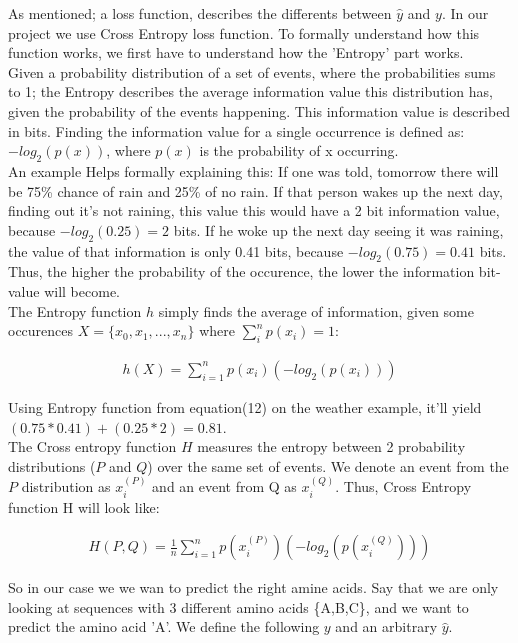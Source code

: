 As mentioned; a loss function, describes the differents between $\hat{y}$ and $y$. In our project we use Cross Entropy loss function. To formally understand how this function works, we first have to understand how the 'Entropy' part works. \\

\noindent
Given a probability distribution of a set of events, where the probabilities sums to 1; the Entropy describes the average information value this distribution has, given the probability of the events happening. This information value is described in bits. Finding the information value for a single occurrence is defined as: $-log_2(p(x))$, where $p(x)$ is the probability of x occurring.\\

\noindent
An example Helps formally explaining this: If one was told, tomorrow there will be 75\% chance of rain and 25\% of no rain. If that person wakes up the next day, finding out it's not raining, this value this would have a 2 bit information value, because $-log_2(0.25) = 2$ bits. If he woke up the next day seeing it was raining, the value of that information is only 0.41 bits, because $-log_2(0.75) = 0.41$ bits. Thus, the higher the probability of the occurence, the lower the information bit-value will become. \\

\noindent
The Entropy function $h$ simply finds the average of information, given some occurences $X=\{x_0,x_1,...,x_n\}$ where $\sum^n_{i} p(x_i) = 1$:

\begin{align}
	h(X) = \sum^n_{i=1} p(x_i)(-log_2(p(x_i)))
\end{align}

\noindent
Using Entropy function from equation(12) on the weather example, it'll yield $(0.75 * 0.41) + (0.25 * 2) = 0.81$.\\

\noindent
The Cross entropy function $H$ measures the entropy between 2 probability distributions ($P$ and $Q$) over the same set of events. We denote an event from the $P$ distribution as $x_i^{(P)}$ and an event from Q as $x_i^{(Q)}$. Thus, Cross Entropy function H will look like:

\begin{align}
	H(P,Q) = \frac{1}{n} \sum^n_{i=1} p(x_i^{(P)})(-log_2(p(x_i^{(Q)})))
\end{align}

\noindent
So in our case we we wan to predict the right amine acids. Say that we are only looking at sequences with 3 different amino acids \{A,B,C\}, and we want to predict the amino acid 'A'. We define the following $y$ and an arbitrary $\hat{y}$.

